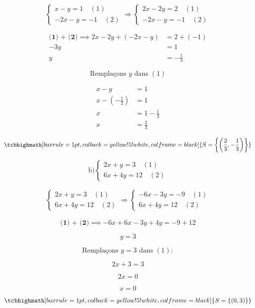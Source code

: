 \documentclass[12pt,a4paper]{article}
\begin{document}
\[
\begin{cases}
x - y = 1 \quad (1) \\
-2x - y = -1 \quad (2)
\end{cases}
\Rightarrow
\begin{cases}
2x - 2y = 2 \quad (1)\\
-2x - y = -1\quad (2)
\end{cases}
\]

\[
\begin{aligned}
\textbf{(1) + (2)} \implies 2x - 2y + (-2x - y) &= 2 + (-1) \\
-3y &= 1 \\
y &= -\frac{1}{3}
\end{aligned}
\]

\[
\text{Remplaçons } y \text{ dans } (1)
\]

\[
\begin{aligned}
x - y &= 1 \\
x - \left( -\frac{1}{3} \right) &= 1 \\
x &= 1 - \frac{1}{3} \\
x &= \frac{2}{3}
\end{aligned}
\]

\[
\tcbhighmath[boxrule=1pt, colback=yellow!5!white, colframe=black]{S = \left\{ \left( \frac{2}{3}, -\frac{1}{3} \right) \right\}
}
\]

\[
\text{b)} 
\begin{cases}
2x + y = 3 \quad (1) \\
6x + 4y = 12 \quad (2)
\end{cases}
\]

\[
\begin{aligned}
\begin{cases}
2x + y = 3 \quad (1) \\
6x + 4y = 12 \quad (2)
\end{cases}
\Rightarrow
\begin{cases}
-6x - 3y = -9 \quad (1) \\
6x + 4y = 12 \quad (2)
\end{cases}
\end{aligned}
\]

\[
\textbf{(1) + (2)}\implies -6x + 6x - 3y + 4y = -9 + 12
\]

\[
y = 3
\]

\[
\text{Remplaçons } y = 3 \text{ dans } (1) :
\]

\[
2x + 3 = 3
\]

\[
2x = 0
\]

\[
x = 0
\]

\[
\tcbhighmath[boxrule=1pt, colback=yellow!5!white, colframe=black]{S = \left\{ (0,3) \right\} }
\]
\end{document}
